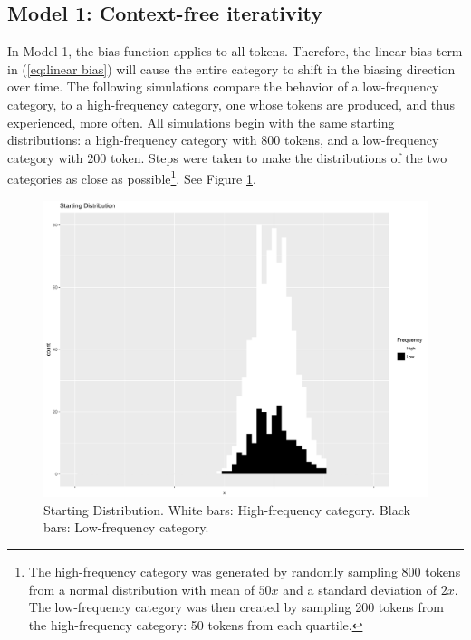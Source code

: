 \subsection{\label{subsec:Model-1:-Context-Free}Model 1: Context-free iterativity}

In Model 1, the bias function applies to all tokens. Therefore, the
linear bias term in (\ref{eq:linear bias}) will cause the entire
category to shift in the biasing direction over time. The following
simulations compare the behavior of a low-frequency category, to a
high-frequency category, one whose tokens are produced, and thus experienced,
more often. All simulations begin with the same starting distributions:
a high-frequency category with 800 tokens, and a low-frequency category
with 200 token. Steps were taken to make the distributions of the
two categories as close as possible\footnote{The high-frequency category was generated by randomly sampling 800
tokens from a normal distribution with mean of $50x$ and a standard
deviation of $2x$. The low-frequency category was then created by
sampling 200 tokens from the high-frequency category: 50 tokens from
each quartile.}. See Figure \ref{fig:Frequency Starting Dist}. 

\begin{figure}[H]

\centering{}\includegraphics[scale=0.3]{figures/startCon.pdf}\caption{\label{fig:Frequency Starting Dist}Starting Distribution. White bars:
High-frequency category. Black bars: Low-frequency category. }
\end{figure}

